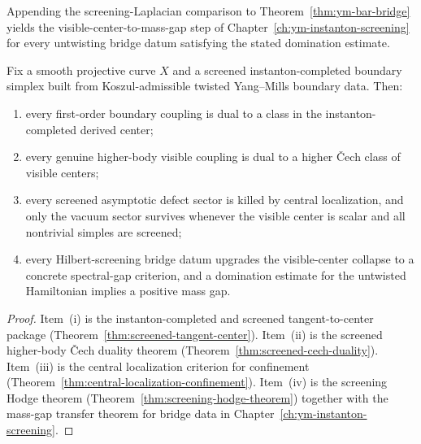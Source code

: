\begin{remark}
\label{rem:ym-bar-bridge-screening-gap}
Appending the screening-Laplacian comparison to
Theorem~\ref{thm:ym-bar-bridge} yields the
visible-center-to-mass-gap step of
Chapter~\ref{ch:ym-instanton-screening} for every untwisting bridge
datum satisfying the stated domination estimate.
\end{remark}

\begin{theorem}
\label{thm:grand-synthesis-principle}
Fix a smooth projective curve $X$ and a screened instanton-completed boundary simplex built from
Koszul-admissible twisted Yang--Mills boundary data.
Then:
\begin{enumerate}[label=(\roman*)]
\item every first-order boundary coupling is dual to a class in the instanton-completed derived center;
\item every genuine higher-body visible coupling is dual to a higher \v{C}ech class of visible centers;
\item every screened asymptotic defect sector is killed by central localization, and only the vacuum sector
survives whenever the visible center is scalar and all nontrivial simples are screened;
\item every Hilbert-screening bridge datum upgrades the visible-center collapse to a concrete spectral-gap criterion,
and a domination estimate for the untwisted Hamiltonian implies a positive mass gap.
\end{enumerate}
\end{theorem}

\begin{proof}
Item~(i) is the instanton-completed and screened tangent-to-center package
(Theorem~\ref{thm:screened-tangent-center}).
Item~(ii) is the screened higher-body \v{C}ech duality theorem
(Theorem~\ref{thm:screened-cech-duality}).
Item~(iii) is the central localization criterion for confinement
(Theorem~\ref{thm:central-localization-confinement}).
Item~(iv) is the screening Hodge theorem
(Theorem~\ref{thm:screening-hodge-theorem}) together with
the mass-gap transfer theorem for bridge data in
Chapter~\ref{ch:ym-instanton-screening}.
\end{proof}

